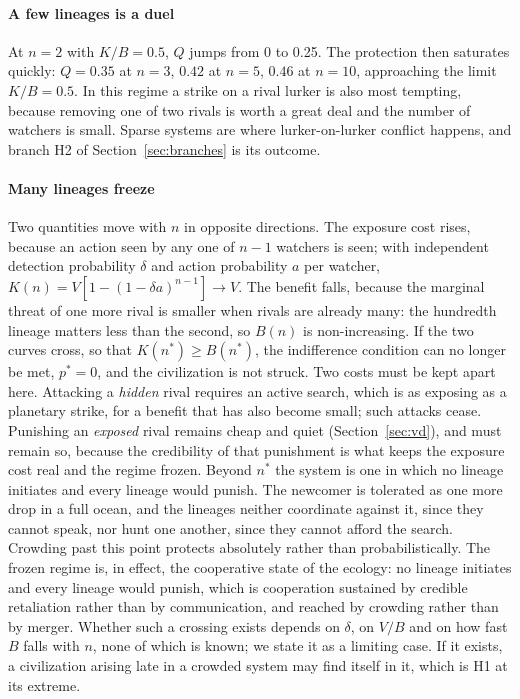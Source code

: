 \documentclass[preprint,12pt]{elsarticle}
\theoremstyle{definition}
\begin{document}
\paragraph{A few lineages is a duel}
At $n = 2$ with $K/B = 0.5$, $Q$ jumps from 0 to 0.25. The protection then saturates quickly: $Q = 0.35$ at $n = 3$, $0.42$ at $n = 5$, $0.46$ at $n = 10$, approaching the limit $K/B = 0.5$. In this regime a strike on a rival lurker is also most tempting, because removing one of two rivals is worth a great deal and the number of watchers is small. Sparse systems are where lurker-on-lurker conflict happens, and branch H2 of Section~\ref{sec:branches} is its outcome.

\paragraph{Many lineages freeze}
Two quantities move with $n$ in opposite directions. The exposure cost rises, because an action seen by any one of $n-1$ watchers is seen; with independent detection probability $\delta$ and action probability $a$ per watcher, $K(n) = V[1-(1-\delta a)^{n-1}] \to V$. The benefit falls, because the marginal threat of one more rival is smaller when rivals are already many: the hundredth lineage matters less than the second, so $B(n)$ is non-increasing. If the two curves cross, so that $K(n^{*}) \geq B(n^{*})$, the indifference condition can no longer be met, $p^{*} = 0$, and the civilization is not struck. Two costs must be kept apart here. Attacking a \emph{hidden} rival requires an active search, which is as exposing as a planetary strike, for a benefit that has also become small; such attacks cease. Punishing an \emph{exposed} rival remains cheap and quiet (Section~\ref{sec:vd}), and must remain so, because the credibility of that punishment is what keeps the exposure cost real and the regime frozen. Beyond $n^{*}$ the system is one in which no lineage initiates and every lineage would punish. The newcomer is tolerated as one more drop in a full ocean, and the lineages neither coordinate against it, since they cannot speak, nor hunt one another, since they cannot afford the search. Crowding past this point protects absolutely rather than probabilistically. The frozen regime is, in effect, the cooperative state of the ecology: no lineage initiates and every lineage would punish, which is cooperation sustained by credible retaliation rather than by communication, and reached by crowding rather than by merger. Whether such a crossing exists depends on $\delta$, on $V/B$ and on how fast $B$ falls with $n$, none of which is known; we state it as a limiting case. If it exists, a civilization arising late in a crowded system may find itself in it, which is H1 at its extreme.
\end{document}

